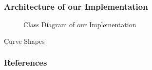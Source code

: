 \documentclass{beamer}
\begin{document}
\begin{frame}
\frametitle{Architecture of our Implementation}
\begin{figure}[htp] 
\caption{Class Diagram of our Implementation}
\end{figure}  
\end{frame}

\begin{frame}{Curve Shapes}
\begin{figure}[!h]
\centering

\end{figure}
\end{frame} 

\begin{frame}[t,allowframebreaks]
	\frametitle{References}
	\printbibliography
\end{frame}
\end{document}
